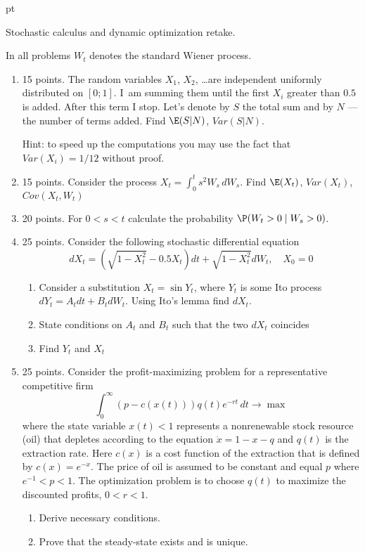 \documentclass[pdftex,12pt,a4paper]{article}
\begin{document}
 pt %

Stochastic calculus and dynamic optimization retake.

In all problems $W_t$ denotes the standard Wiener process.

\begin{enumerate}
\item 15 points. The random variables $X_1$, $X_2$, \ldots are independent uniformly distributed on $[0;1]$. I~am summing them until the first $X_i$ greater than $0.5$ is added. After this term I stop. Let's denote by $S$ the total sum and by $N$ --- the number of terms added. Find $\E(S|N)$, $Var(S|N)$.

Hint: to speed up the computations you may use the fact that $Var(X_i)=1/12$ without proof.
\item 15 points. Consider the process $X_t=\int_0^t s^2W_s\,dW_s$. Find $\E(X_t)$, $Var(X_t)$, $Cov(X_t,W_t)$

\item 20 points. For $0<s<t$ calculate the probability $\P(W_t>0 \mid W_s>0)$. 
\item 25 points. Consider the following stochastic differential equation
\begin{equation}
dX_t=(\sqrt{1-X_t^2}-0.5X_t)dt+\sqrt{1-X_t^2}dW_t, \quad X_0=0
\end{equation}
\begin{enumerate}
\item Consider a substitution $X_t=\sin Y_t$, where $Y_t$ is some Ito process $dY_t=A_tdt+B_tdW_t$. Using Ito's lemma find $dX_t$.
\item State conditions on $A_t$ and $B_t$ such that the two $dX_t$ coincides
\item Find $Y_t$ and $X_t$
\end{enumerate}
\item 25 points. Consider the profit-maximizing problem for a representative competitive firm 
\begin{equation}
\int_0^{\infty}(p-c(x(t)))q(t)e^{-rt}\,dt\rightarrow \max
\end{equation}
 where the state variable $x(t)<1$ represents a nonrenewable stock resource (oil) that depletes according to the equation $\dot{x}=1-x-q$ and $q(t)$ is the extraction rate. Here $c(x)$ is a cost function of the extraction that is defined by $c(x)=e^{-x}$. The price of oil is assumed to be constant and equal $p$ where $e^{-1}<p<1$. The optimization problem is to choose $q(t)$ to maximize the discounted profits, $0<r<1$.
\begin{enumerate}
\item Derive necessary conditions.
\item Prove that the steady-state exists and is unique.
\end{enumerate}
\end{enumerate}
\end{document}
